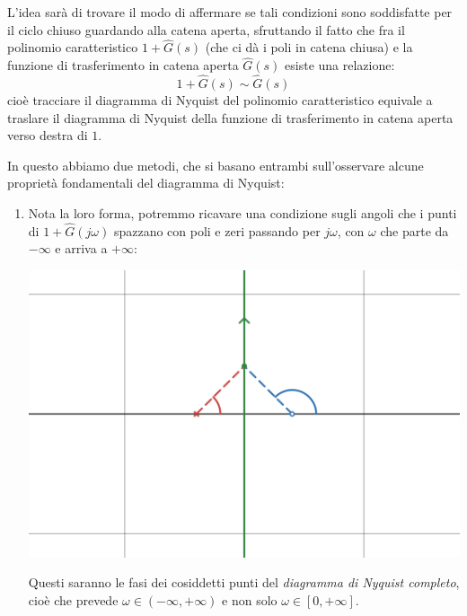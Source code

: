 \documentclass[a4paper,11pt]{article}
\begin{document}
L'idea sarà di trovare il modo di affermare se tali condizioni sono soddisfatte per il ciclo chiuso guardando alla catena aperta, sfruttando il fatto che fra il polinomio caratteristico $1 + \hat{G}(s)$ (che ci dà i poli in catena chiusa) e la funzione di trasferimento in catena aperta $\hat{G}(s)$ esiste una relazione:
$$
1 + \hat{G}(s) \sim \hat{G}(s)
$$
cioè tracciare il diagramma di Nyquist del polinomio caratteristico equivale a traslare il diagramma di Nyquist della funzione di trasferimento in catena aperta verso destra di $1$.

In questo abbiamo due metodi, che si basano entrambi sull'osservare alcune proprietà fondamentali del diagramma di Nyquist:
\begin{enumerate}
	\item 
		Nota la loro forma, potremmo ricavare una condizione sugli angoli che i punti di $1 + \hat{G}(j\omega)$ spazzano con poli e zeri passando per $j\omega$, con $\omega$ che parte da $-\infty$ e arriva a $+\infty$:
		\begin{center}
			\includegraphics[scale=0.28]{../figures/nyq_crit_m1.png}
		\end{center}
		Questi saranno le fasi dei cosiddetti punti del \textit{diagramma di Nyquist completo}, cioè che prevede $\omega \in (-\infty, +\infty)$ e non solo $\omega \in [0, +\infty]$.
	
		\noindent
		
		\begin{minipage}{\textwidth}


\end{minipage}
\end{enumerate}
\end{document}

